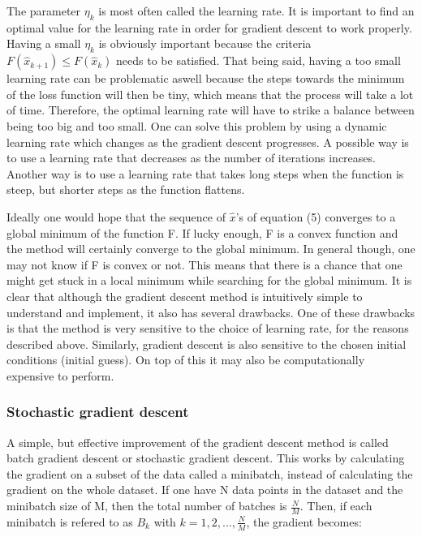 \documentclass[a4paper,12pt]{article}
\begin{document}
The parameter $\eta_k$ is most often called the learning rate. It is important to find an optimal value for the learning rate in order for gradient descent to work properly. Having a small $\eta_k$ is obviously important because the criteria $F(\hat{x}_{k+1}) \leq F(\hat{x}_k)$ needs to be satisfied. That being said, having a too small learning rate can be problematic aswell because the steps towards the minimum of the loss function will then be tiny, which means that the process will take a lot of time. Therefore, the optimal learning rate will have to strike a balance between being too big and too small.\newline
One can solve this problem by using a dynamic learning rate which changes as the gradient descent progresses. A possible way is to use a learning rate that decreases as the number of iterations increases. Another way is to use a learning rate that takes long steps when the function is steep, but shorter steps as the function flattens.\newline


Ideally one would hope that the sequence of $\hat{x}$'s of equation (5) converges to a global minimum of the function F. If lucky enough, F is a convex function and the method will certainly converge to the global minimum.\newline 
In general though, one may not know if F is convex or not. This means that there is a chance that one might get stuck in a local minimum while searching for the global minimum. It is clear that although the gradient descent method is intuitively simple to understand and implement, it also has several drawbacks.\newline
One of these drawbacks is that the method is very sensitive to the choice of learning rate, for the reasons described above. Similarly, gradient descent is also sensitive to the chosen initial conditions (initial guess). On top of this it may also be computationally expensive to perform.

\subsubsection{Stochastic gradient descent}
A simple, but effective improvement of the gradient descent method is called batch gradient descent or stochastic gradient descent. This works by calculating the gradient on a subset of the data called a minibatch, instead of calculating the gradient on the whole dataset. If one have N data points in the dataset and the minibatch size of M, then the total number of batches is $\frac{N}{M}$. Then, if each minibatch is refered to as $B_k$ with $k = 1, 2,..., \frac{N}{M}$, the gradient becomes:
\end{document}
